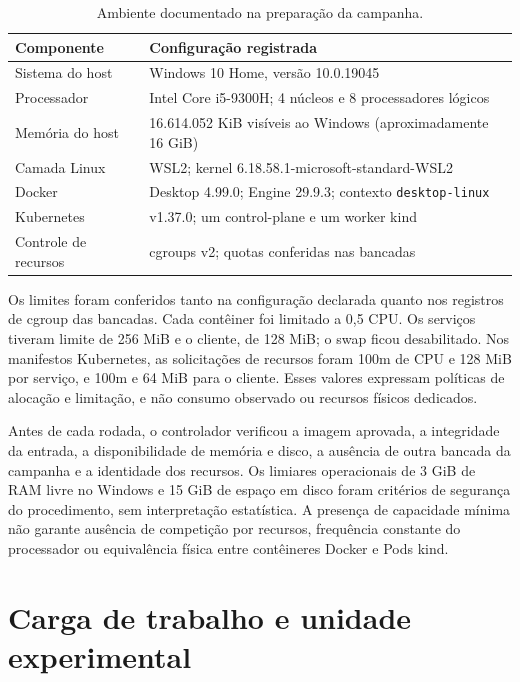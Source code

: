 \begin{table}[htbp]
\centering\small
\caption{Ambiente documentado na preparação da campanha.}
\label{tab:ambiente-versoes}
\begin{tabularx}{\linewidth}{@{}p{4cm}X@{}}
\toprule
Componente & Configuração registrada \\
\midrule
Sistema do host & Windows 10 Home, versão 10.0.19045 \\
Processador & Intel Core i5-9300H; 4 núcleos e 8 processadores lógicos \\
Memória do host & 16.614.052 KiB visíveis ao Windows (aproximadamente 16 GiB) \\
Camada Linux & WSL2; kernel 6.18.58.1-microsoft-standard-WSL2 \\
Docker & Desktop 4.99.0; Engine 29.9.3; contexto \texttt{desktop-linux} \\
Kubernetes & v1.37.0; um control-plane e um worker kind \\
Controle de recursos & cgroups v2; quotas conferidas nas bancadas \\
\bottomrule
\end{tabularx}
\end{table}

Os limites foram conferidos tanto na configuração declarada quanto nos registros de cgroup das bancadas. Cada contêiner foi limitado a 0,5 CPU. Os serviços tiveram limite de 256 MiB e o cliente, de 128 MiB; o swap ficou desabilitado. Nos manifestos Kubernetes, as solicitações de recursos foram 100m de CPU e 128 MiB por serviço, e 100m e 64 MiB para o cliente. Esses valores expressam políticas de alocação e limitação, e não consumo observado ou recursos físicos dedicados.

Antes de cada rodada, o controlador verificou a imagem aprovada, a integridade da entrada, a disponibilidade de memória e disco, a ausência de outra bancada da campanha e a identidade dos recursos. Os limiares operacionais de 3 GiB de RAM livre no Windows e 15 GiB de espaço em disco foram critérios de segurança do procedimento, sem interpretação estatística. A presença de capacidade mínima não garante ausência de competição por recursos, frequência constante do processador ou equivalência física entre contêineres Docker e Pods kind.

\section{Carga de trabalho e unidade experimental}

